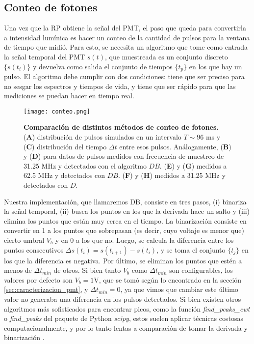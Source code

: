 \subsection{Conteo de fotones} \label{sec:conteo}


Una vez que la RP obtiene la señal del PMT, el paso que queda para convertirla a intensidad lumínica es hacer un conteo de la cantidad de pulsos para la ventana de tiempo que midió.
Para esto, se necesita un algoritmo que tome como entrada la señal temporal del PMT $s(t)$, que muestreada es un conjunto discreto $\{s(t_i)\}$ y devuelva como salida el conjunto de tiempos $\{t_p\}$ en los que hay un pulso.
El algoritmo debe cumplir con dos condiciones: tiene que ser preciso para no sesgar los espectros y tiempos de vida, y tiene que ser rápido para que las mediciones se puedan hacer en tiempo real.

\begin{figure}
    \centering
    \texttt{[image: conteo.png]}
    \caption{\textbf{Comparación de distintos métodos de conteo de fotones.} (\textbf{A}) distribución de pulsos simulados en un intervalo $T \sim 96$ ms y (\textbf{C}) distribución del tiempo $\Delta t$ entre esos pulsos. Análogamente, (\textbf{B}) y (\textbf{D}) para datos de pulsos medidos con frecuencia de muestreo de 31.25 MHz y detectados con el algoritmo $DB$. (\textbf{E}) y (\textbf{G}) medidos a 62.5 MHz y detectados con $DB$. (\textbf{F}) y (\textbf{H}) medidos a 31.25 MHz y detectados con $D$.}
    \label{fig:conteo}
\end{figure}

Nuestra implementación, que llamaremos DB, consiste en tres pasos, (i) binariza la señal temporal, (ii) busca los puntos en los que la derivada hace un salto y (iii) elimina los puntos que están muy cerca en el tiempo.
La binarización consiste en convertir en 1 a los puntos que sobrepasan (es decir, cuyo voltaje es menor que) cierto umbral $V_b$ y en 0 a los que no. 
Luego, se calcula la diferencia entre los puntos consecutivos $\Delta s(t_i) = s(t_{i+1}) - s(t_i)$, y se toma el conjunto $\{t_j\}$ en los que la diferencia es negativa.
Por último, se eliminan los puntos que estén a menos de $\Delta t_{min}$ de otros.
Si bien tanto $V_b$ como $\Delta t_{min}$ son configurables, los valores por defecto son $V_b = 1$V, que se tomó según lo encontrado en la sección \ref{sec:caracterizacion_pmt}, y $\Delta t_{min} = 0$, ya que vimos que cambiar este último valor no generaba una diferencia en los pulsos detectados.
Si bien existen otros algoritmos más sofisticados para encontrar picos, como la función \textit{find\_peaks\_cwt} o \textit{find\_peaks} del paquete de Python \textit{scipy}, estos suelen aplicar técnicas costosas computacionalmente, y por lo tanto lentas a comparación de tomar la derivada y binarización \cite{du_improved_2006}.

